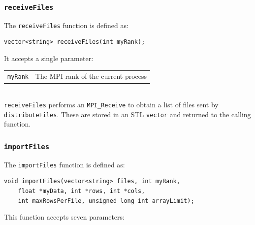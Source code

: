 \documentclass{article}
\begin{document}
%
%

\subsubsection{\texttt{receiveFiles}}\label{sec:receivefiles}

The \texttt{receiveFiles} function is defined as:

\lstset{language=C++, keepspaces=true}
\begin{lstlisting}
vector<string> receiveFiles(int myRank);
\end{lstlisting}

It accepts a single parameter: \\

\begin{tabular}{l l}
\texttt{myRank} & The MPI rank of the current process \\
\end{tabular} \\

\texttt{receiveFiles} performs an \texttt{MPI\_Receive} to obtain a list of files sent by \texttt{distributeFiles}. These are stored in an STL \texttt{vector} and returned to the calling function.


%
%

\subsubsection{\texttt{importFiles}}\label{sec:importFiles}


The \texttt{importFiles} function is defined as:

\begin{minipage}{\linewidth}
\lstset{language=C++, keepspaces=true}
\begin{lstlisting}
void importFiles(vector<string> files, int myRank,
	float *myData, int *rows, int *cols, 
	int maxRowsPerFile, unsigned long int arrayLimit);
\end{lstlisting}
\end{minipage}

This function accepts seven parameters: \\
\end{document}
